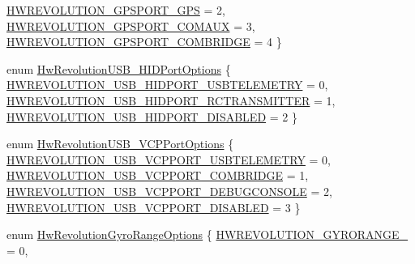 \begin{DoxyCompactItemize}
\hyperlink{group___hw_revolution_gga3a2bf3928aeee92b353b9f72700d33fca65118e7606a5bd310190a6113edb801a}{\-H\-W\-R\-E\-V\-O\-L\-U\-T\-I\-O\-N\-\_\-\-G\-P\-S\-P\-O\-R\-T\-\_\-\-G\-P\-S} = 2, 
\hyperlink{group___hw_revolution_gga3a2bf3928aeee92b353b9f72700d33fca3ff517e8d8d9b7d893421122206f8db5}{\-H\-W\-R\-E\-V\-O\-L\-U\-T\-I\-O\-N\-\_\-\-G\-P\-S\-P\-O\-R\-T\-\_\-\-C\-O\-M\-A\-U\-X} = 3, 
\*
\hyperlink{group___hw_revolution_gga3a2bf3928aeee92b353b9f72700d33fcabc3e056cacf870cd5895073a0ff283bf}{\-H\-W\-R\-E\-V\-O\-L\-U\-T\-I\-O\-N\-\_\-\-G\-P\-S\-P\-O\-R\-T\-\_\-\-C\-O\-M\-B\-R\-I\-D\-G\-E} = 4
 \}
\item 
enum \hyperlink{group___hw_revolution_gac7d125b1ba6ea2d287e8fe34692ee30e}{\-Hw\-Revolution\-U\-S\-B\-\_\-\-H\-I\-D\-Port\-Options} \{ \hyperlink{group___hw_revolution_ggac7d125b1ba6ea2d287e8fe34692ee30ea64a63acaada40f23d8fb40994e2f3015}{\-H\-W\-R\-E\-V\-O\-L\-U\-T\-I\-O\-N\-\_\-\-U\-S\-B\-\_\-\-H\-I\-D\-P\-O\-R\-T\-\_\-\-U\-S\-B\-T\-E\-L\-E\-M\-E\-T\-R\-Y} = 0, 
\hyperlink{group___hw_revolution_ggac7d125b1ba6ea2d287e8fe34692ee30ea83bc6adda828c51acccf503fe4e7d776}{\-H\-W\-R\-E\-V\-O\-L\-U\-T\-I\-O\-N\-\_\-\-U\-S\-B\-\_\-\-H\-I\-D\-P\-O\-R\-T\-\_\-\-R\-C\-T\-R\-A\-N\-S\-M\-I\-T\-T\-E\-R} = 1, 
\hyperlink{group___hw_revolution_ggac7d125b1ba6ea2d287e8fe34692ee30ea24f0701a13beaad45b6ae77a1f8df2a9}{\-H\-W\-R\-E\-V\-O\-L\-U\-T\-I\-O\-N\-\_\-\-U\-S\-B\-\_\-\-H\-I\-D\-P\-O\-R\-T\-\_\-\-D\-I\-S\-A\-B\-L\-E\-D} = 2
 \}
\item 
enum \hyperlink{group___hw_revolution_ga488d95bf6238e5402e6ca82f400db692}{\-Hw\-Revolution\-U\-S\-B\-\_\-\-V\-C\-P\-Port\-Options} \{ \hyperlink{group___hw_revolution_gga488d95bf6238e5402e6ca82f400db692ae2f64b4e5062df791ab53fff9166d461}{\-H\-W\-R\-E\-V\-O\-L\-U\-T\-I\-O\-N\-\_\-\-U\-S\-B\-\_\-\-V\-C\-P\-P\-O\-R\-T\-\_\-\-U\-S\-B\-T\-E\-L\-E\-M\-E\-T\-R\-Y} = 0, 
\hyperlink{group___hw_revolution_gga488d95bf6238e5402e6ca82f400db692a9726e1e513cbf1faf6a84209fdd35f65}{\-H\-W\-R\-E\-V\-O\-L\-U\-T\-I\-O\-N\-\_\-\-U\-S\-B\-\_\-\-V\-C\-P\-P\-O\-R\-T\-\_\-\-C\-O\-M\-B\-R\-I\-D\-G\-E} = 1, 
\hyperlink{group___hw_revolution_gga488d95bf6238e5402e6ca82f400db692a6717e61127a01e4862e602ab56da1613}{\-H\-W\-R\-E\-V\-O\-L\-U\-T\-I\-O\-N\-\_\-\-U\-S\-B\-\_\-\-V\-C\-P\-P\-O\-R\-T\-\_\-\-D\-E\-B\-U\-G\-C\-O\-N\-S\-O\-L\-E} = 2, 
\hyperlink{group___hw_revolution_gga488d95bf6238e5402e6ca82f400db692aea8403f8c380fe2a679af1c17a81d2c8}{\-H\-W\-R\-E\-V\-O\-L\-U\-T\-I\-O\-N\-\_\-\-U\-S\-B\-\_\-\-V\-C\-P\-P\-O\-R\-T\-\_\-\-D\-I\-S\-A\-B\-L\-E\-D} = 3
 \}
\item 
enum \hyperlink{group___hw_revolution_ga369ce51edd77e5805346bf1a71fbb613}{\-Hw\-Revolution\-Gyro\-Range\-Options} \{ \hyperlink{group___hw_revolution_gga369ce51edd77e5805346bf1a71fbb613a2b42d42270b7a9bf23b2e4bbdcc46f80}{\-H\-W\-R\-E\-V\-O\-L\-U\-T\-I\-O\-N\-\_\-\-G\-Y\-R\-O\-R\-A\-N\-G\-E\-\_} = 0, 

\end{DoxyCompactItemize}
